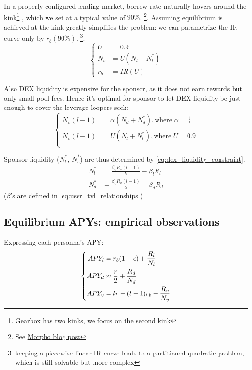 \documentclass{article}
\begin{document}
    In a properly configured lending market, borrow rate naturally hovers around the kink\footnote{Gearbox has two kinks, we focus on the second kink}
    , which we set at a typical value of $90\%$.
    \footnote{See \href{https://morpho.org/blog/introducing-the-adaptivecurveirm-efficient-and-autonomous}{Morpho blog post}}.
    Assuming equilibrium is achieved at the kink greatly simplifies the problem: we can parametrize the IR curve only by $r_b(90\%)$. 
    \footnote{keeping a piecewise linear IR curve leads to a partitioned quadratic problem, which is still solvable but more complex}.
    \begin{equation*}
        \left\{
        \begin{aligned}
            U &= 0.9\\
            N_b &= U(N_l+N_l^*)\\
            r_b &= IR(U)
        \end{aligned}
        \right.
    \end{equation*}

    Also DEX liquidity is expensive for the sponsor, as it does not earn rewards but only small pool fees. 
    Hence it's optimal for sponsor to let DEX liquidity be just enough to cover the leverage loopers seek: 
    \begin{equation}
        \left\{
        \begin{aligned}
            N_v(l-1)&=\alpha (N_d+N_d^*), 
        \text{where } \alpha=\frac{1}{2}\\
        N_v(l-1)&=U(N_l+N_l^*),
        \text{where } U=0.9\\
        \end{aligned}
        \right.
        \label{eq:dex_liquidity_constraint}
    \end{equation}
    
    Sponsor liquidity ($N_l^*$, $N_d^*$) are thus determined by \ref{eq:dex_liquidity_constraint}.\\
    \begin{align*}
        N_l^* &= \frac{\beta_v R_v(l-1)}{U} - \beta_l R_l \\
        N_d^* &= \frac{\beta_v R_v(l-1)}{\alpha} - \beta_d R_d
    \end{align*}
    ($\beta$'s are defined in \ref{eq:user_tvl_relationships})
    
\subsection{Equilibrium APYs: empirical observations}
    Expressing each personna's APY:
    \begin{equation*}
    \left\{
    \begin{aligned}
        APY_l &= r_b(1-\epsilon) + \frac{R_l}{N_l}\\
        APY_d &\approx \frac{r}{2}+\frac{R_d}{N_d}\\
        APY_v &= l \space r - (l-1)r_b + \frac{R_v}{N_v}
    \end{aligned}
    \right.
    \end{equation*}
    
\end{document}
